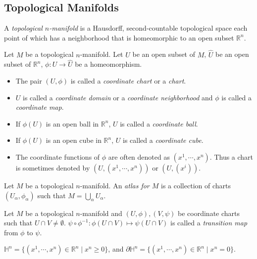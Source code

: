 \subsection{Topological Manifolds}

\begin{defn}
  A \textit{topological $n$-manifold} is a Hausdorff, second-countable topological space each point of which has a neighborhood that is homeomorphic to an open subset $\mathbb{R}^n$.
\end{defn}

\begin{defn}[Coordinates]
  Let $M$ be a topological $n$-manifold.
  Let $U$ be an open subset of $M$, $\hat{U}$ be an open subset of $\mathbb{R}^n$, $\phi: U \rightarrow \hat{U}$ be a homeomorphism.
  \begin{itemize}
    \item
      The pair $(U, \phi)$ is called a \textit{coordinate chart} or a \textit{chart}.
    \item
      $U$ is called a \textit{coordinate domain} or a \textit{coordinate neighborhood} and $\phi$ is called a \textit{coordinate map}.
    \item
      If $\phi(U)$ is an open ball in $\mathbb{R}^n$, $U$ is called a \textit{coordinate ball}.
    \item
      If $\phi(U)$ is an open cube in $\mathbb{R}^n$, $U$ is called a \textit{coordinate cube}.
    \item
      The coordinate functions of $\phi$ are often denoted as $(x^1, \cdots, x^n)$.
      Thus a chart is sometimes denoted by $(U, (x^1, \cdots, x^n))$ or $(U, (x^i))$.
  \end{itemize}
\end{defn}

\begin{defn}[Atlas]
  Let $M$ be a topological $n$-manifold.
  An \textit{atlas for $M$} is a collection of charts $(U_{\alpha}, \phi_{\alpha})$ such that $M = \bigcup_{\alpha} U_{\alpha}$.
\end{defn}

\begin{defn}
  Let $M$ be a topological $n$-manifold and $(U, \phi), (V, \psi)$ be coordinate charts such that $U \cap V \ne \emptyset$.
  $\psi \circ \phi^{-1}: \phi(U \cap V) \mapsto \psi(U \cap V)$ is called a \textit{transition map} from $\phi$ to $\psi$.
\end{defn}

\begin{defn}
  $\mathbb{H}^n = \{ (x^1, \cdots, x^n) \in \mathbb{R}^n \mid x^n \geq 0 \}$, and $\partial \mathbb{H}^n = \{ (x^1, \cdots, x^n) \in \mathbb{R}^n \mid x^n = 0 \}$.
\end{defn}

